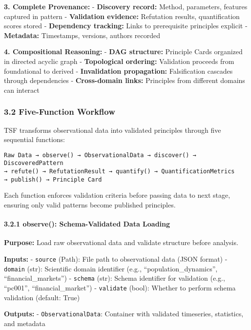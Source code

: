 \documentclass[
]{article}
\begin{document}
\textbf{3. Complete Provenance:} - \textbf{Discovery record:} Method,
parameters, features captured in pattern - \textbf{Validation evidence:}
Refutation results, quantification scores stored - \textbf{Dependency
tracking:} Links to prerequisite principles explicit -
\textbf{Metadata:} Timestamps, versions, authors recorded

\textbf{4. Compositional Reasoning:} - \textbf{DAG structure:} Principle
Cards organized in directed acyclic graph - \textbf{Topological
ordering:} Validation proceeds from foundational to derived -
\textbf{Invalidation propagation:} Falsification cascades through
dependencies - \textbf{Cross-domain links:} Principles from different
domains can interact

\subsubsection{3.2 Five-Function Workflow}\label{five-function-workflow}

TSF transforms observational data into validated principles through five
sequential functions:

\begin{verbatim}
Raw Data → observe() → ObservationalData → discover() → DiscoveredPattern
→ refute() → RefutationResult → quantify() → QuantificationMetrics
→ publish() → Principle Card
\end{verbatim}

Each function enforces validation criteria before passing data to next
stage, ensuring only valid patterns become published principles.

\paragraph{3.2.1 observe(): Schema-Validated Data
Loading}\label{observe-schema-validated-data-loading}

\textbf{Purpose:} Load raw observational data and validate structure
before analysis.

\textbf{Inputs:} - \texttt{source} (Path): File path to observational
data (JSON format) - \texttt{domain} (str): Scientific domain identifier
(e.g., ``population\_dynamics'', ``financial\_markets'') -
\texttt{schema} (str): Schema identifier for validation (e.g.,
``pc001'', ``financial\_market'') - \texttt{validate} (bool): Whether to
perform schema validation (default: True)

\textbf{Outputs:} - \texttt{ObservationalData}: Container with validated
timeseries, statistics, and metadata
\end{document}
